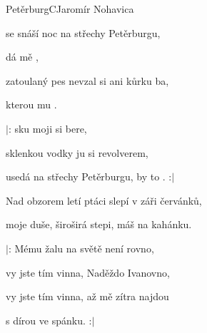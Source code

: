 \begin{song}{Petěrburg}{C}{Jaromír Nohavica}

\begin{SBVerse}

 se snáší noc na střechy Petěrburgu,

dá  mě ,

zatoulaný pes nevzal si ani kůrku ba,

kterou  mu .

\end{SBVerse}

\begin{SBChorus}

$|$: sku moji   si bere,

 sklenkou vodky ju si  revolverem,

 usedá na střechy Petěrburgu,  by to . :$|$

\end{SBChorus}

\begin{SBVerse}

Nad obzorem letí ptáci slepí v záři červánků,

moje duše, široširá stepi, máš na kahánku.

\end{SBVerse}

\begin{SBChorus}

$|$: Mému žalu na světě není rovno,

vy jste tím vinna, Naděždo Ivanovno,

vy jste tím vinna, až mě zítra najdou

s dírou ve spánku. :$|$

\end{SBChorus}

\end{song}

\clearpage
